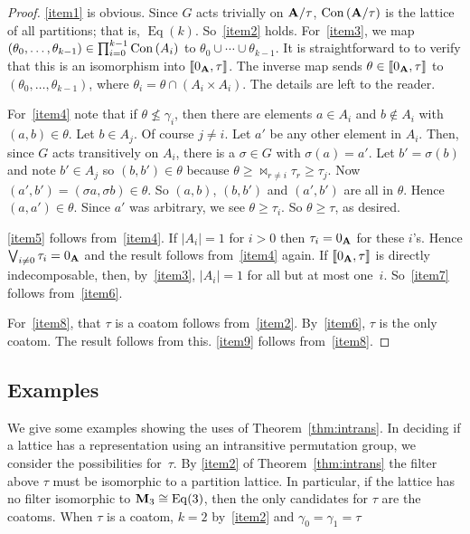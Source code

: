 \begin{proof}
\eqref{item1} is obvious. Since $G$ acts trivially on $\mathbf{A}/\tau$,
$\operatorname{Con\,} (\mathbf{A}/\tau)$ is the lattice of all partitions; that is, 
$\operatorname{Eq}(k)$. So~\eqref{item2} holds. For~\eqref{item3},
we map
$(\theta_0, \ldots, \theta_{k-1}) \in \prod_{i=0}^{k-1} \operatorname{Con\,}(A_i)$
to $\theta_0 \cup \cdots \cup \theta_{k-1}$. It is straightforward to
to verify that this is an isomorphism into $\llbracket 0_{\mathbf{A}},\tau\rrbracket$. The inverse
map sends $\theta \in \llbracket 0_{\mathbf{A}},\tau\rrbracket$ to $(\theta_0, \ldots, \theta_{k-1})$,
where $\theta_i = \theta \cap (A_i \times A_i)$. The details are left to the reader.

For~\eqref{item4} note that if 
$\theta \not\le \gamma_i$, then
there are elements $a \in A_i$ and $b \notin A_i$ with
$(a,b) \in \theta$. Let $b \in A_j$. Of course $j \ne i$.
Let $a'$ be any other element in $A_i$. Then,
since $G$ acts transitively on $A_i$,
there is a  $\sigma \in G$ with $\sigma(a)  = a'$. Let $b' = \sigma(b)$
and note $b' \in A_j$ so $(b,b') \in \theta$ because $\theta \ge
\Join_{r\ne i} \tau_r \ge \tau_j$.
Now
$(a',b') = (\sigma a,\sigma b) \in \theta.$
So $(a,b)$, $(b,b')$ and $(a',b')$ are all in $\theta$. Hence
$(a,a') \in \theta$. Since $a'$ was arbitrary, we see
$\theta \ge \tau_i$. So $\theta \ge \tau$, as desired.

\eqref{item5} follows from~\eqref{item4}. If
$|A_i| = 1$ for $i> 0$ then $\tau_i = 0_{\mathbf{A}}$ for these $i$'s. Hence
$\bigvee_{i\ne 0} \tau_i = 0_{\mathbf{A}}$ and the result follows
from~\eqref{item4} again. If $\llbracket 0_{\mathbf{A}},\tau\rrbracket$ is directly indecomposable, then,
by~\eqref{item3}, $|A_i| = 1$ for all but at most one~$i$. So~\eqref{item7}
follows from~\eqref{item6}.

For~\eqref{item8}, that $\tau$ is a coatom follows from~\eqref{item2}. 
By~\eqref{item6}, $\tau$ is the only coatom. The result follows from this.
\eqref{item9} follows from~\eqref{item8}.
\end{proof}

\subsection{Examples}

We give some examples showing the uses of Theorem~\ref{thm:intrans}. 
In deciding if a lattice has a representation using an intransitive
permutation group, we consider the possibilities for~$\tau$. 
By \eqref{item2} of Theorem~\ref{thm:intrans} the filter above
$\tau$ must be isomorphic to a partition lattice. In particular,
if the lattice has no filter isomorphic to $\mathbf{M}_3 \cong \operatorname{Eq}(3)$, then the 
only candidates for $\tau$ are the coatoms. When $\tau$ is a coatom, $k = 2$
by~\eqref{item2} and $\gamma_0 = \gamma_1 = \tau$

